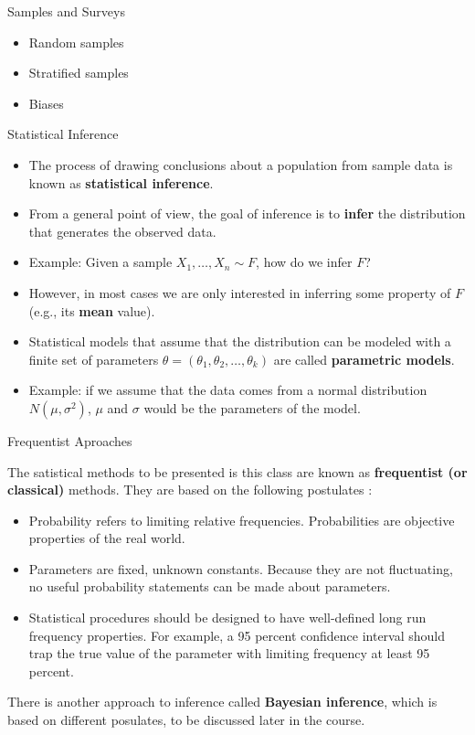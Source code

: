 \documentclass[handout]{beamer}
\begin{document}
\begin{frame}{Samples and Surveys}
\scriptsize{
\begin{itemize}
 \item Random samples
 \item Stratified samples
 \item Biases

\end{itemize}

} 
\end{frame}


\begin{frame}{Statistical Inference }
\scriptsize{
\begin{itemize}
 \item The process of drawing conclusions about a population from sample data is known as \textbf{statistical inference}.
\item From a general point of view, the goal of inference is to \textbf{infer} the distribution that generates the observed data.
\item Example: Given a sample $X_1, \dots, X_n \sim F$, how do we infer $F$? 
\item However, in most cases we are only interested in inferring some property of $F$ (e.g., its \textbf{mean} value).
\item Statistical models that assume that the distribution can be modeled with a finite set of parameters $\theta= (\theta_{1},\theta_{2},\dots,\theta_{k})$ are called \textbf{parametric models}. 
\item Example: if we assume that the data comes from a normal distribution $N(\mu,\sigma^2)$, $\mu$ and $\sigma$ would be the parameters of the model. 
\end{itemize}

} 
\end{frame}


\begin{frame}{Frequentist Aproaches}
\scriptsize{
The satistical methods to be presented is this class are known as \textbf{frequentist (or classical)} methods. They are based on the following postulates  \cite{wasserman2013all}:
\begin{itemize}
\item Probability refers to limiting relative frequencies. Probabilities are objective properties of the real world.
\item Parameters are fixed, unknown constants. Because they are not fluctuating, no useful probability statements can be made about parameters.
\item Statistical procedures should be designed to have well-defined long run frequency properties. For example, a 95 percent confidence interval should trap the true value of the parameter with limiting frequency at least 95 percent.
\end{itemize}
There is another approach to inference called \textbf{Bayesian inference}, which is based on different posulates, to be discussed later in the course.

} 
\end{frame}
\end{document}

